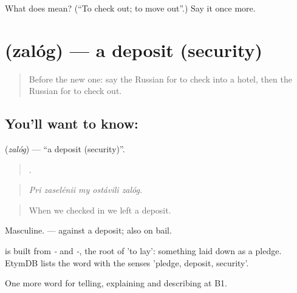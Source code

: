 \begin{tcolorbox}[breakable,colback=teal!4,colframe=teal!35!black,title={Before you move on}]
What does  mean? (\textquotedblleft{}To check out; to move out\textquotedblright{}.) Say it once more.
\end{tcolorbox}
\section[\texorpdfstring{\ru{залог} (zalóg)}{залог (zalóg)}]{ (zalóg) — a deposit (security)}

\label{lesson:RU-C429-zalog}



\begin{quote}
Before the new one: say the Russian for to check into a hotel, then the Russian for to check out.
\end{quote}

\subsection*{You'll want to know: }
\textbf{} (\emph{zalóg}) — \textquotedblleft{}a deposit (security)\textquotedblright{}.

\begin{quote}
    .
\end{quote}

\begin{quote}
\emph{Pri zaselénii my ostávili zalóg.}
\end{quote}

\begin{quote}
When we checked in we left a deposit.
\end{quote}

Masculine. \emph{ } — against a deposit; also on bail.

\begin{cousinweb}
\emph{} is built from \emph{-} and \emph{-}, the root of \emph{} 'to lay': something laid down as a pledge. EtymDB lists the word with the senses 'pledge, deposit, security'.
\end{cousinweb}

\begin{grammarlens}[title={What you've built}]
One more word for telling, explaining and describing at B1.
\end{grammarlens}

